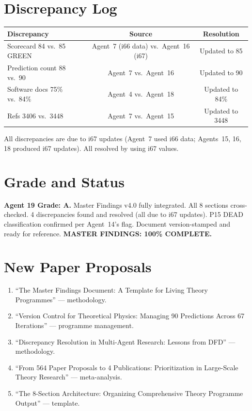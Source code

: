 \documentclass[11pt,a4paper]{article}
\begin{document}
\section{Discrepancy Log}

\begin{center}
\begin{tabular}{lcc}
\toprule
\textbf{Discrepancy} & \textbf{Source} & \textbf{Resolution} \\
\midrule
Scorecard 84 vs.\ 85 GREEN & Agent~7 (i66 data) vs.\ Agent~16 (i67) & Updated to 85 \\
Prediction count 88 vs.\ 90 & Agent~7 vs.\ Agent~16 & Updated to 90 \\
Software docs 75\% vs.\ 84\% & Agent~4 vs.\ Agent~18 & Updated to 84\% \\
Refs 3406 vs.\ 3448 & Agent~7 vs.\ Agent~15 & Updated to 3448 \\
\bottomrule
\end{tabular}
\end{center}

All discrepancies are due to i67 updates (Agent~7 used i66 data; Agents~15, 16, 18 produced i67 updates). All resolved by using i67 values.

\section{Grade and Status}

\begin{tcolorbox}[colback=green!5!white,colframe=green!40!black]
\textbf{Agent 19 Grade: A.} Master Findings v4.0 fully integrated. All 8 sections cross-checked. 4 discrepancies found and resolved (all due to i67 updates). P15 DEAD classification confirmed per Agent~14's flag. Document version-stamped and ready for reference. \textbf{MASTER FINDINGS: 100\% COMPLETE.}
\end{tcolorbox}

\section{New Paper Proposals}

\begin{enumerate}
\item ``The Master Findings Document: A Template for Living Theory Programmes'' --- methodology.
\item ``Version Control for Theoretical Physics: Managing 90 Predictions Across 67 Iterations'' --- programme management.
\item ``Discrepancy Resolution in Multi-Agent Research: Lessons from DFD'' --- methodology.
\item ``From 564 Paper Proposals to 4 Publications: Prioritization in Large-Scale Theory Research'' --- meta-analysis.
\item ``The 8-Section Architecture: Organizing Comprehensive Theory Programme Output'' --- template.
\end{enumerate}
\end{document}
